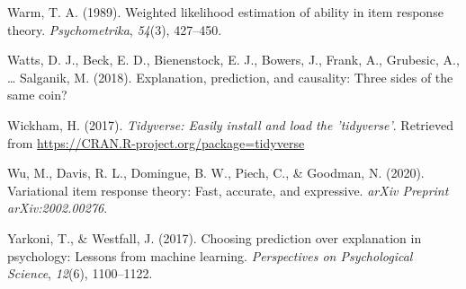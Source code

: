 \documentclass[
  english,
  man,floatsintext]{apa7}
\newlength{\cslhangindent}
\newlength{\cslentryspacingunit} %
\newenvironment{CSLReferences}[2] %
 {%
  \setlength{\parindent}{0pt}
  \ifodd #1
  \let\oldpar\par
  \def\par{\hangindent=\cslhangindent\oldpar}
  \fi
  \setlength{\parskip}{#2\cslentryspacingunit}
 }%
 {}
\begin{document}
\begin{CSLReferences}{1}{0}
\leavevmode{}%
Warm, T. A. (1989). Weighted likelihood estimation of ability in item response theory. \emph{Psychometrika}, \emph{54}(3), 427--450.

\leavevmode{}%
Watts, D. J., Beck, E. D., Bienenstock, E. J., Bowers, J., Frank, A., Grubesic, A., \ldots{} Salganik, M. (2018). Explanation, prediction, and causality: Three sides of the same coin?

\leavevmode{}%
Wickham, H. (2017). \emph{Tidyverse: Easily install and load the 'tidyverse'}. Retrieved from \url{https://CRAN.R-project.org/package=tidyverse}

\leavevmode{}%
Wu, M., Davis, R. L., Domingue, B. W., Piech, C., \& Goodman, N. (2020). Variational item response theory: Fast, accurate, and expressive. \emph{arXiv Preprint arXiv:2002.00276}.

\leavevmode{}%
Yarkoni, T., \& Westfall, J. (2017). Choosing prediction over explanation in psychology: Lessons from machine learning. \emph{Perspectives on Psychological Science}, \emph{12}(6), 1100--1122.

\end{CSLReferences}

\endgroup
\end{document}
